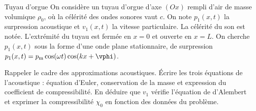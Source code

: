 \begin{exo}[PSI][1][TD]{Tuyau d'orgue}
On considère un tuyau d'orgue d'axe $(Ox)$ rempli d'air de masse volumique $\rho_0$, où la célérité des ondes sonores vaut $c$. On note $p_1(x,t)$ la surpression acoustique et $v_1(x,t)$ la vitesse particulaire. La célérité du son est notée. L'extrémité du tuyau est fermée en $x = 0$ et ouverte en $x = L$. On cherche $p_1(x,t)$ sous la forme d'une onde plane stationnaire, de surpression $p_1(x,t) = p_{\rm m} \cos(\omega t) \cos(kx + \vphi)$.

\begin{quest}

	\item Rappeler le cadre des approximations acoustiques. Écrire les trois équations de l'acoustique : équation d'Euler, conservation de la masse et expression du coefficient de compressibilité. En déduire que $v_1$ vérifie l'équation de d'Alembert et exprimer la compressibilité $\chi_0$ en fonction des données du problème.


\end{quest}
\end{exo}
